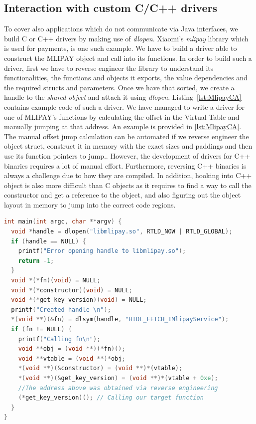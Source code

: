 \documentclass[a4paper,11pt,oneside]{article}
\begin{document}
\subsection{Interaction with custom C/C++ drivers}
\label{sub:CDriver}
To cover also applications which do not communicate via Java interfaces, we build C or C++ drivers by making use of \emph{dlopen}.
Xiaomi's \emph{mlipay} library
which is used for payments, is one such example. We have to build a driver able to construct the MLIPAY object and call into its functions. In order to
build such a driver, first we have to reverse engineer the library to
understand its functionalities, the functions and objects it exports, the value dependencies and the required structs and parameters. Once we have that sorted, we create a handle to the \emph{shared object} and
attach it using \emph{dlopen}. Listing~\ref{lst:MlipayCA} contains example code of such a driver.
We have managed to write a driver for one of MLIPAY's functions by calculating the offset in the Virtual Table and manually jumping at that address.
An example is provided in \autoref{lst:MlipayCA}.
The manual offset jump calculation can be automated if we reverse engineer the object struct, construct it in memory with the exact sizes and paddings and then use its function pointers to jump..
However, the development of drivers for C++ binaries requires a lot of manual effort. Furthermore, reversing C++ binaries is always a challenge due to how they are compiled. In addition, hooking into C++ object is also more difficult than C objects as it requires to find a way to call the constructor and get a reference to the object, and also figuring out the object layout in memory to jump into the correct code regions.
\begin{lstlisting}[language=C++, label={lst:MlipayCA}, caption= Example driver for mlipay using dlopen]
int main(int argc, char **argv) {
  void *handle = dlopen("libmlipay.so", RTLD_NOW | RTLD_GLOBAL);
  if (handle == NULL) {
    printf("Error opening handle to libmlipay.so");
    return -1;
  }
  void *(*fn)(void) = NULL;
  void *(*constructor)(void) = NULL;
  void *(*get_key_version)(void) = NULL;
  printf("Created handle \n");
  *(void **)(&fn) = dlsym(handle, "HIDL_FETCH_IMlipayService");
  if (fn != NULL) {
    printf("Calling fn\n");
    void **obj = (void **)(*fn)();
    void **vtable = (void **)*obj;
    *(void **)(&constructor) = (void **)*(vtable);
    *(void **)(&get_key_version) = (void **)*(vtable + 0xe);
    //The address above was obtained via reverse engineering
    (*get_key_version)(); // Calling our target function
  }
}
\end{lstlisting}
\end{document}
